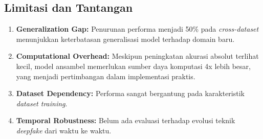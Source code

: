 \subsection{Limitasi dan Tantangan}

\begin{enumerate}
    \item \textbf{Generalization Gap:} Penurunan performa menjadi 50\% pada \textit{cross-dataset} menunjukkan keterbatasan generalisasi model terhadap domain baru.
    
    \item \textbf{Computational Overhead:} Meskipun peningkatan akurasi absolut terlihat kecil, model ansambel memerlukan sumber daya komputasi 4x lebih besar, yang menjadi pertimbangan dalam implementasi praktis.
    
    \item \textbf{Dataset Dependency:} Performa sangat bergantung pada karakteristik \textit{dataset training}.
    
    \item \textbf{Temporal Robustness:} Belum ada evaluasi terhadap evolusi teknik \textit{deepfake} dari waktu ke waktu.
\end{enumerate}